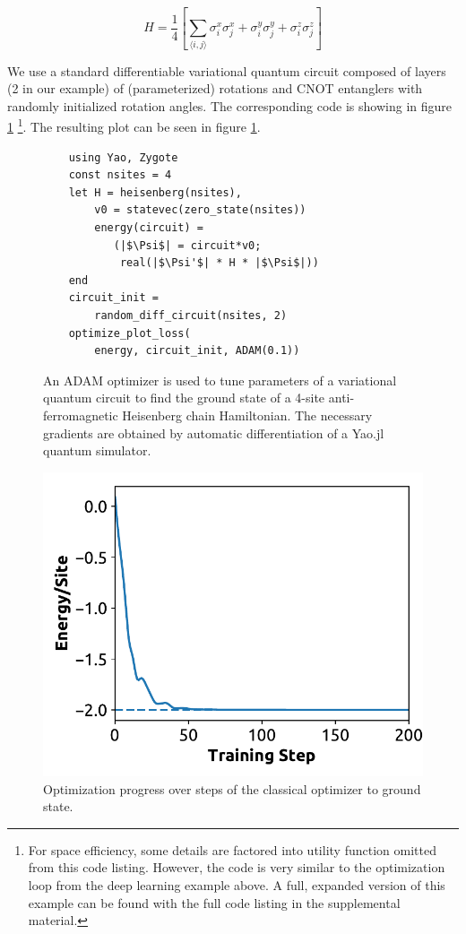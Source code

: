 \documentclass{juliacon}
\begin{document}
\[
H = \frac{1}{4} \left[ \sum_{\langle i, j \rangle} \sigma_i^x \sigma_j^x + \sigma_i^y \sigma_j^y +  \sigma_i^z \sigma_j^z \right]
\]

We use a standard differentiable variational quantum circuit composed of layers (2 in our example) of (parameterized) rotations and CNOT entanglers with randomly initialized rotation angles. The corresponding code is showing in figure \ref{fig:yao_loss}  \footnote{For space efficiency, some details are factored into utility function omitted from this code listing. However, the code is very similar to the optimization loop from the deep learning example above. A full, expanded version of this example can be found with the full code listing in the supplemental material.}. The resulting plot can be seen in figure \ref{fig:yao_loss}.

\begin{figure}
    \begin{minipage}{0.48\textwidth}
    \begin{verbatim}
    using Yao, Zygote
    const nsites = 4
    let H = heisenberg(nsites),
        v0 = statevec(zero_state(nsites))
        energy(circuit) =
           (|$\Psi$| = circuit*v0;
            real(|$\Psi'$| * H * |$\Psi$|))
    end
    circuit_init =
        random_diff_circuit(nsites, 2)
    optimize_plot_loss(
        energy, circuit_init, ADAM(0.1))
    \end{verbatim}
  \caption{An ADAM optimizer is used to tune parameters of a variational quantum circuit to find the ground state of a 4-site anti-ferromagnetic Heisenberg chain Hamiltonian. The necessary gradients are obtained by automatic differentiation of a Yao.jl quantum simulator.}
\end{minipage}
  \includegraphics[width=\linewidth]{images/yao_loss_plot.png}
  \caption{Optimization progress over steps of the classical optimizer to ground state.\label{fig:yao_loss}}
\endminipage
\end{figure}
\end{document}
